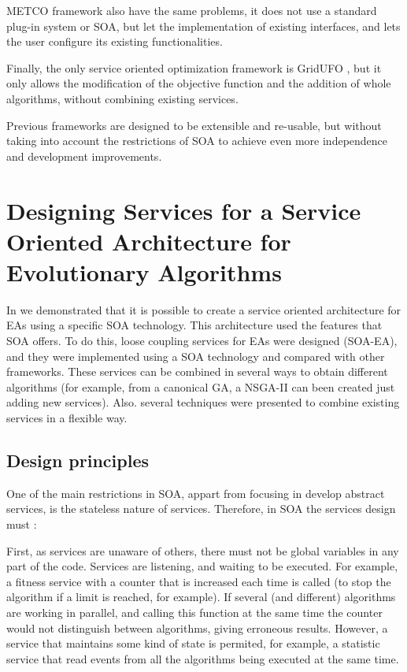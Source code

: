 \documentclass{sig-alternate}
\begin{document}
METCO framework \cite{METCO} also have the same problems, it does not use a standard plug-in system or SOA, but let the implementation of existing interfaces, and lets the user configure its existing functionalities.

Finally, the only service oriented optimization framework is GridUFO \cite{GRIDUFO}, but it only allows the modification of the objective function and the addition of whole algorithms, without combining existing services.

Previous frameworks are designed to be extensible and re-usable, but without taking into account the restrictions of SOA to achieve even more independence and development improvements.

\section{Designing Services for a Service Oriented Architecture for Evolutionary Algorithms}
\label{sec:design}

In \cite{OSGILIATH} we demonstrated that it is possible to create a service oriented architecture for EAs using a specific SOA technology. This architecture used the features that SOA offers. To do this, loose coupling services for EAs were designed (SOA-EA), and they were implemented using a SOA technology and compared with other frameworks. These services can be combined in several ways to obtain different algorithms (for example, from a canonical GA, a NSGA-II can been created just adding new services). Also. several techniques were presented to combine existing services in a flexible way.



\subsection{Design principles}


One of the main restrictions in SOA, appart from focusing in develop abstract services, is the stateless nature of services. Therefore, in SOA the services design must :

First, as services are unaware of others, there must not be global variables in any part of the code. Services are listening, and waiting to be executed. For example, a fitness service with a counter that is increased each time is called (to stop the algorithm if a limit is reached, for example). If several (and different) algorithms are working in parallel, and calling this function at the same time the counter would not distinguish between algorithms, giving erroneous results. However, a service that maintains some kind of state is permited, for example, a statistic service that read events from all the algorithms being executed at the same time.
\end{document}
